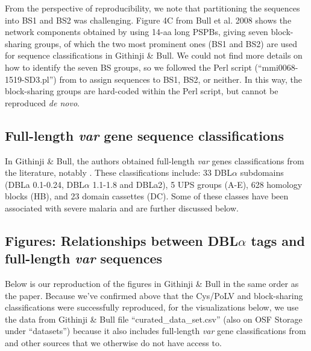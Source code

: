 \documentclass[10pt,twocolumn,superscriptaddress]{revtex4-1}
\newcommand{\var}{{\it var}\xspace}
\newcommand{\dbla}{{DBL$\alpha$}\xspace}
\newcommand{\cp}{{Cys/PoLV}\xspace}
\newcommand{\paper}{{Githinji \& Bull}\xspace}
\begin{document}
From the perspective of reproducibility, we note that partitioning the sequences into BS1 and BS2 was challenging. Figure 4C from Bull et al. 2008 \cite{bull2008} shows the network components obtained by using 14-aa long PSPBs, giving seven block-sharing groups, of which the two most prominent ones (BS1 and BS2) are used for sequence classifications in \paper. We could not find more details on how to identify the seven BS groups, so we followed the Perl script (``mmi0068-1519-SD3.pl'') from \cite{bull2008} to assign sequences to BS1, BS2, or neither. In this way, the block-sharing groups are hard-coded within the Perl script, but cannot be reproduced \textit{de novo}.  

\subsection{Full-length \var gene sequence classifications}
In \paper \cite{githinji2017}, the authors obtained full-length \var genes classifications from the literature, notably \cite{rask2010}. These classifications include: 33 \dbla subdomains (DBLa 0.1-0.24, \dbla 1.1-1.8 and DBLa2), 5 UPS groups (A-E), 628 homology blocks (HB), and 23 domain cassettes (DC). Some of these classes have been associated with severe malaria and are further discussed below. 

\subsection{Figures: Relationships between \dbla tags and full-length \var sequences}
Below is our reproduction of the figures in \paper in the same order as the paper. Because we've confirmed above that the \cp and block-sharing classifications were successfully reproduced, for the visualizations below, we use the data from \paper file ``curated\_data\_set.csv'' (also on OSF Storage under ``datasets'') because it also includes full-length \var gene classifications from \cite{rask2010} and other sources that we otherwise do not have access to. 
\end{document}
